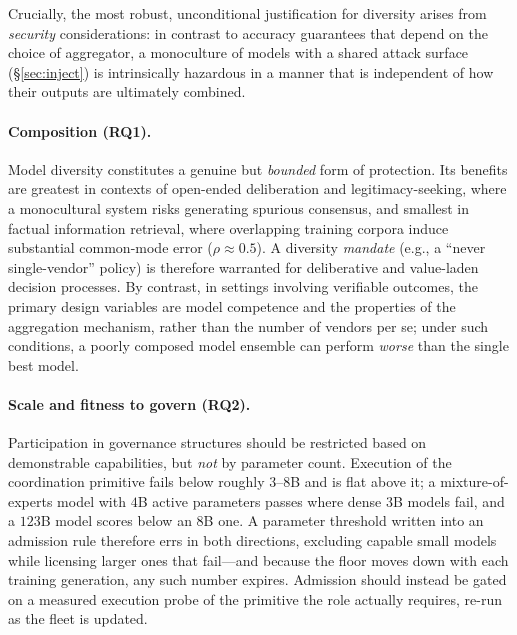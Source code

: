 \documentclass[manuscript,screen,review]{acmart}
\newcommand{\rev}[1]{\textcolor{revblue}{#1}}
\begin{document}
Crucially, the most robust, unconditional justification for diversity arises from \emph{security} considerations: in contrast to accuracy guarantees that depend on the choice of aggregator, a monoculture of models with a shared attack surface (\S\ref{sec:inject}) is intrinsically hazardous in a manner that is independent of how their outputs are ultimately combined.

\paragraph{Composition (RQ1).} Model diversity constitutes a genuine but \emph{bounded} form of protection. Its benefits are greatest in contexts of open-ended deliberation and legitimacy-seeking, where a monocultural system risks generating spurious consensus, and smallest in factual information retrieval, where overlapping training corpora induce substantial common-mode error ($\rho \approx 0.5$). A diversity \emph{mandate} (e.g., a ``never single-vendor'' policy) is therefore warranted for deliberative and value-laden decision processes. By contrast, in settings involving verifiable outcomes, the primary design variables are model competence and the properties of the aggregation mechanism, rather than the number of vendors per se; under such conditions, a poorly composed model ensemble can perform \emph{worse} than the single best model.

\paragraph{Scale and fitness to govern (RQ2).} \rev{Participation in governance structures should be restricted based on demonstrable capabilities, but \emph{not} by parameter count. Execution of the coordination primitive fails below roughly $3$--$8$B and is flat above it; a mixture-of-experts model with $4$B active parameters passes where dense $3$B models fail, and a $123$B model scores below an $8$B one. A parameter threshold written into an admission rule therefore errs in both directions, excluding capable small models while licensing larger ones that fail---and because the floor moves down with each training generation, any such number expires. Admission should instead be gated on a measured execution probe of the primitive the role actually requires, re-run as the fleet is updated.}
\end{document}
